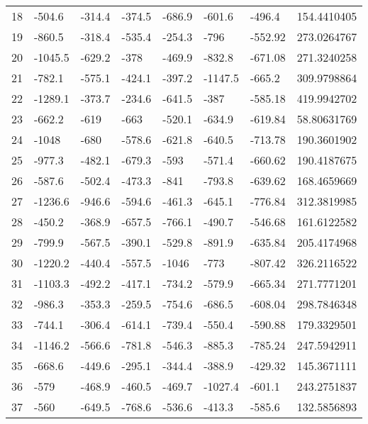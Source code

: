 \begin{table}[h]
\begin{tabular}{llllllll}
18      & -504.6  & -314.4  & -374.5  & -686.9  & -601.6  & -496.4   & 154.4410405        \\
19      & -860.5  & -318.4  & -535.4  & -254.3  & -796    & -552.92  & 273.0264767        \\
20      & -1045.5 & -629.2  & -378    & -469.9  & -832.8  & -671.08  & 271.3240258        \\
21      & -782.1  & -575.1  & -424.1  & -397.2  & -1147.5 & -665.2   & 309.9798864        \\
22      & -1289.1 & -373.7  & -234.6  & -641.5  & -387    & -585.18  & 419.9942702        \\
23      & -662.2  & -619    & -663    & -520.1  & -634.9  & -619.84  & 58.80631769        \\
24      & -1048   & -680    & -578.6  & -621.8  & -640.5  & -713.78  & 190.3601902        \\
25      & -977.3  & -482.1  & -679.3  & -593    & -571.4  & -660.62  & 190.4187675        \\
26      & -587.6  & -502.4  & -473.3  & -841    & -793.8  & -639.62  & 168.4659669        \\
27      & -1236.6 & -946.6  & -594.6  & -461.3  & -645.1  & -776.84  & 312.3819985        \\
28      & -450.2  & -368.9  & -657.5  & -766.1  & -490.7  & -546.68  & 161.6122582        \\
29      & -799.9  & -567.5  & -390.1  & -529.8  & -891.9  & -635.84  & 205.4174968        \\
30      & -1220.2 & -440.4  & -557.5  & -1046   & -773    & -807.42  & 326.2116522        \\
31      & -1103.3 & -492.2  & -417.1  & -734.2  & -579.9  & -665.34  & 271.7771201        \\
32      & -986.3  & -353.3  & -259.5  & -754.6  & -686.5  & -608.04  & 298.7846348        \\
33      & -744.1  & -306.4  & -614.1  & -739.4  & -550.4  & -590.88  & 179.3329501        \\
34      & -1146.2 & -566.6  & -781.8  & -546.3  & -885.3  & -785.24  & 247.5942911        \\
35      & -668.6  & -449.6  & -295.1  & -344.4  & -388.9  & -429.32  & 145.3671111        \\
36      & -579    & -468.9  & -460.5  & -469.7  & -1027.4 & -601.1   & 243.2751837        \\
37      & -560    & -649.5  & -768.6  & -536.6  & -413.3  & -585.6   & 132.5856893        \\

\end{tabular}
\end{table}
